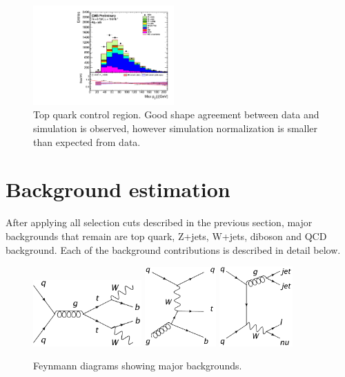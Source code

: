 \begin{figure}[htbp]
		\includegraphics[width=0.48\textwidth]{Figures/Results/Muon/prefit/Wbb_max_hJet_pt_doQCD1.pdf}		
	\caption[Signal region detector level distributions.]{Top quark control region. Good shape agreement between data and simulation is observed, however simulation normalization is smaller than expected from data.}
	\label{fig:TT_CR}
\end{figure}

\section{Background estimation}
\label{sec:background}
After applying all selection cuts described in the previous section, major backgrounds that remain are top quark, Z+jets, W+jets, diboson and QCD background. Each of the background contributions is described in detail below. 

\begin{figure}[htbp]
	\centering
		\includegraphics[width=0.37\textwidth]{Figures/FD-tt.png}
		\includegraphics[width=0.245\textwidth]{Figures/FD-st.png}
		\includegraphics[width=0.25\textwidth]{Figures/FD-WJ.png}
	\caption[Feynmann diagrams showing major backgrounds]{Feynmann diagrams showing major backgrounds.}
	\label{fig:backgrounds}
\end{figure}

